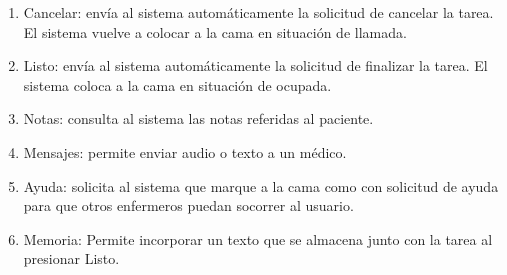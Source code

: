 \begin{enumerate}
\item Cancelar: envía al sistema automáticamente la solicitud de cancelar la tarea. El sistema vuelve a colocar a la cama en situación de llamada.
\item Listo: envía al sistema automáticamente la solicitud de finalizar la tarea. El sistema coloca a la cama en situación de ocupada.
\item Notas: consulta al sistema las notas referidas al paciente. 
\item Mensajes: permite enviar audio o texto a un médico. 
\item Ayuda: solicita al sistema que marque a la cama como con solicitud de ayuda para que otros enfermeros puedan socorrer al usuario. 
\item Memoria: Permite incorporar un texto que se almacena junto con la tarea al presionar Listo.
\end{enumerate}




